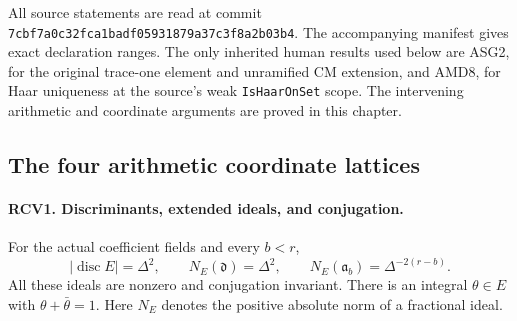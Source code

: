 All source statements are read at commit
\texttt{7cbf7a0c32fca1badf05931879a37c3f8a2b03b4}.  The accompanying
manifest gives exact declaration ranges.  The only inherited human
results used below are ASG2, for the original trace-one element and
unramified CM extension, and AMD8, for Haar uniqueness at the source's
weak \texttt{IsHaarOnSet} scope.  The intervening arithmetic and
coordinate arguments are proved in this chapter.

\subsection{The four arithmetic coordinate lattices}

\paragraph{RCV1. Discriminants, extended ideals, and conjugation.}
\label{claim:RCV1}
For the actual coefficient fields and every \(b<r\),
\[
 |\operatorname{disc}E|=\Delta^2,\qquad
 N_E(\mathfrak d)=\Delta^2,\qquad
 N_E(\mathfrak a_b)=\Delta^{-2(r-b)}.
\tag{RCV.3}
\]
All these ideals are nonzero and conjugation invariant.  There is an
integral \(\theta\in E\) with \(\theta+\bar\theta=1\).
Here \(N_E\) denotes the positive absolute norm of a fractional ideal.
